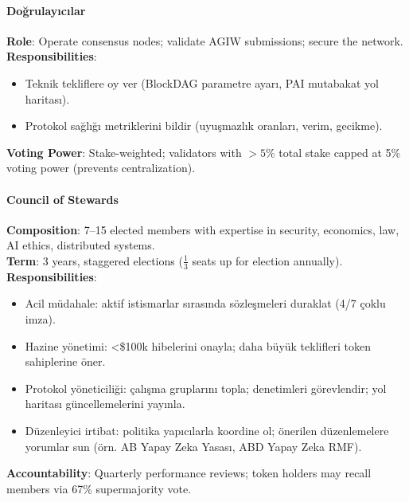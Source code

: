 \documentclass[11pt]{article}
\begin{document}
\begin{itemize}[noitemsep]
\begin{itemize}[noitemsep]
\begin{itemize}[noitemsep]
\begin{itemize}[noitemsep]
\begin{itemize}[noitemsep]
\begin{itemize}[noitemsep]
\begin{itemize}[noitemsep]
\begin{enumerate}[noitemsep]
\begin{itemize}[noitemsep]
\paragraph{Doğrulayıcılar}
\textbf{Role}: Operate consensus nodes; validate AGIW submissions; secure the network.\\
\textbf{Responsibilities}:
\begin{itemize}[noitemsep]
  \item Teknik tekliflere oy ver (BlockDAG parametre ayarı, PAI mutabakat yol haritası).
  \item Protokol sağlığı metriklerini bildir (uyuşmazlık oranları, verim, gecikme).
\end{itemize}
\textbf{Voting Power}: Stake-weighted; validators with $>5\%$ total stake capped at 5\% voting power (prevents centralization).

\paragraph{Council of Stewards}
\textbf{Composition}: 7--15 elected members with expertise in security, economics, law, AI ethics, distributed systems.\\
\textbf{Term}: 3 years, staggered elections ($\frac{1}{3}$ seats up for election annually).\\
\textbf{Responsibilities}:
\begin{itemize}[noitemsep]
  \item Acil müdahale: aktif istismarlar sırasında sözleşmeleri duraklat (4/7 çoklu imza).
  \item Hazine yönetimi: <\$100k hibelerini onayla; daha büyük teklifleri token sahiplerine öner.
  \item Protokol yöneticiliği: çalışma gruplarını topla; denetimleri görevlendir; yol haritası güncellemelerini yayınla.
  \item Düzenleyici irtibat: politika yapıcılarla koordine ol; önerilen düzenlemelere yorumlar sun (örn. AB Yapay Zeka Yasası, ABD Yapay Zeka RMF).
\end{itemize}
\textbf{Accountability}: Quarterly performance reviews; token holders may recall members via 67\% supermajority vote.


\end{itemize}
\end{enumerate}
\end{itemize}
\end{itemize}
\end{itemize}
\end{itemize}
\end{itemize}
\end{itemize}
\end{itemize}
\end{document}
